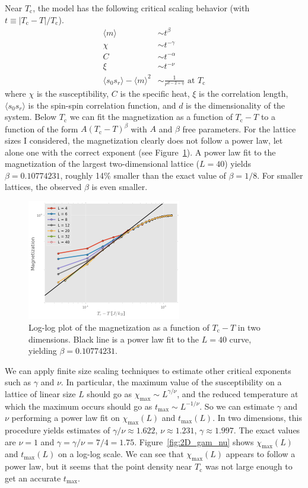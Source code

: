 \documentclass[11pt, oneside]{article}
\begin{document}
Near $T_\text{c}$, the model has the following critical scaling behavior (with $t\equiv|T_\text{c}-T|/T_\text{c}$).
\begin{align*}
\langle{m}\rangle&\sim t^\beta\\
\chi&\sim t^{-\gamma}\\
C&\sim t^{-\alpha}\\
\xi&\sim t^{-\nu}\\
\langle{s_0s_r}\rangle-\langle{m}\rangle^2&\sim\frac{1}{r^{d-2+\eta}}\text{ at $T_\text{c}$}%
\end{align*}
where $\chi$ is the susceptibility, $C$ is the specific heat, $\xi$ is the correlation length, $\langle{s_0s_r}\rangle$ is the spin-spin correlation function, and $d$ is the dimensionality of the system. Below $T_\text{c}$ we can fit the magnetization as a function of $T_\text{c}-T$ to a function of the form $A(T_\text{c}-T)^\beta$ with $A$ and $\beta$ free parameters. For the lattice sizes I considered, the magnetization clearly does not follow a power law, let alone one with the correct exponent (see Figure~\ref{fig:2D_mag_loglog}). A power law fit to the magnetization of the largest two-dimensional lattice ($L=40$) yields $\beta=0.10774231$, roughly 14\% smaller than the exact value of $\beta=1/8$. For smaller lattices, the observed $\beta$ is even smaller.
\begin{figure}[H]
   \centering
   \includegraphics[width=0.6\textwidth]{img/2D/mag_loglog} %
   \caption{Log-log plot of the magnetization as a function of $T_\text{c}-T$ in two dimensions. Black line is a power law fit to the $L=40$ curve, yielding $\beta=0.10774231$.}
   \label{fig:2D_mag_loglog}
\end{figure}
We can apply finite size scaling techniques to estimate other critical exponents such as $\gamma$ and $\nu$. In particular, the maximum value of the susceptibility on a lattice of linear size $L$ should go as $\chi_\text{max}\sim L^{\gamma/\nu}$, and the reduced temperature at which the maximum occurs should go as $t_\text{max}\sim L^{-1/\nu}$. So we can estimate $\gamma$ and $\nu$ performing a power law fit on $\chi_\text{max}(L)$ and $t_\text{max}(L)$. In two dimensions, this procedure yields estimates of $\gamma/\nu\approx1.622$, $\nu\approx1.231$, $\gamma\approx1.997$. The exact values are $\nu=1$ and $\gamma=\gamma/\nu=7/4=1.75$. Figure~\ref{fig:2D_gam_nu} shows $\chi_\text{max}(L)$ and $t_\text{max}(L)$ on a log-log scale. We can see that $\chi_\text{max} (L)$ appears to follow a power law, but it seems that the point density near $T_\text{c}$ was not large enough to get an accurate $t_\text{max}$.
\end{document}
